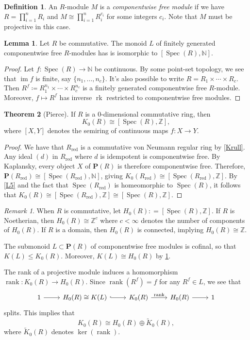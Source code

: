 \documentclass[10pt,letterpaper,cm]{nupset}
\theoremstyle{definition}
\newtheorem{definition}{Definition}
\theoremstyle{theorem}
\newtheorem{theorem}{Theorem}
\newtheorem{lemma}[theorem]{Lemma}
\theoremstyle{remark}
\newtheorem{remark}{Remark}
\newcommand{\N}{\mathbb N}
\renewcommand{\P}{\mathbf P}
\newcommand{\Z}{\mathbb Z}
\newcommand{\1}{\mathbf{1}}
\newcommand{\0}{\vec 0}
\DeclareMathOperator{\im}{im}
\DeclareMathOperator{\red}{red}
\DeclareMathOperator{\spec}{Spec}
\DeclareMathOperator{\rank}{rank}
\DeclareMathOperator{\rk}{rk}
\begin{document}
\begin{definition}
An $R$-module $M$ is a \textit{componentwise free module} if we have $R = \prod_{i=1}^n R_i$ and $M \cong \prod_{i=1}^n R_i^{c_i}$ for some integers $c_i$. Note that $M$ must be projective in this case.
\end{definition}

\begin{lemma}\label{L6}
Let $R$ be commutative. The monoid $L$ of finitely generated componentwise free $R$-modules has is isomorphic to $\left[\spec(R), \N\right]$.
\end{lemma}
\begin{proof}
Let $f: \spec(R) \to \N$ be continuous. By some point-set topology, we see that $\im f$ is finite, say $\{n_1, \ldots, n_c\}$. It's also possible to write $R= R_1 \times \cdots \times R_c$. Then $R^f \coloneqq R_1^{n_1} \times \cdots \times R_c^{n_c}$ is a finitely generated componentwise free $R$-module. Moreover, $f \mapsto R^f$ has inverse $\rk$ restricted to componentwise free modules.
\end{proof}


\begin{theorem}[Pierce]
If $R$ is a $0$-dimensional commutative ring, then $$K_0(R) \cong \left[\spec(R), \Z\right],$$ where $[X, Y]$ denotes the semiring of continuous maps $f: X\to Y$.
\end{theorem}
\begin{proof}
We have that $R_{\red}$ is a commutative von Neumann regular ring by \cref{Krull}. Any ideal $(d)$ in $R_{\red}$  where $d$ is idempotent is componentwise free. By Kaplansky, every object $X$ of $\P(R)$ is therefore componentwise free. Therefore, $\P(R_{\red}) \cong [\spec(R_{\red}), \N]$, giving $K_0(R_{\red}) \cong [\spec(R_{\red}), \Z]$. By \cref{L5} and the fact that $\spec(R_{\red})$ is homeomorphic to $\spec(R)$, it follows that $K_0(R)\cong [\spec(R_{\red}), \Z] \cong [\spec(R), \Z]$.
\end{proof}

\begin{remark}
When $R$ is commutative, let $H_0(R): = [\spec(R), \Z]$. If $R$ is Noetherian, then $H_0(R) \cong \Z^c$ where $c <\infty$ denotes the number of components of $H_0(R)$. If $R$ is a domain, then $H_0(R)$ is connected, implying $H_0(R) \cong \Z$.

The submonoid $L\subset \P(R)$ of componentwise free modules is cofinal, so that $K(L) \leq K_0(R)$. Moreover, $K(L) \cong H_0(R)$ by \cref{L6}.

The rank of a projective module induces a homomorphism $\rank: K_0(R) \to H_0(R)$. Since $\rank(R^f) = f$ for any $R^f \in L$, we see that
\[
\begin{tikzcd}
1 \arrow[r] & H_0(R) \cong K(L) \arrow[r, hook] & K_0(R) \arrow[r, "\rank"] & H_0(R) \arrow[r] & 1
\end{tikzcd}
\]
splits. This implies that $$K_0(R) \cong H_0(R) \oplus \widetilde{K}_0(R),$$ where $\widetilde{K}_0(R)$ denotes $\ker(\rank)$.
\end{remark}
\end{document}
